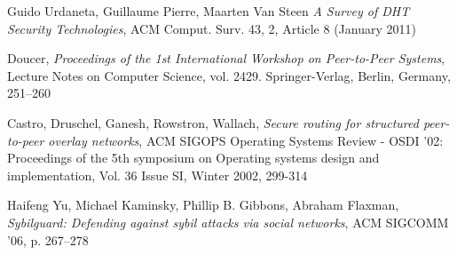 \begin{thebibliography}{99}

 Guido Urdaneta, Guillaume Pierre, Maarten Van Steen
\textit{A Survey of DHT Security Technologies}, ACM Comput. Surv.  43, 2,
Article 8 (January 2011)

 Doucer, \textit{Proceedings of the 1st International
Workshop on Peer-to-Peer Systems}, Lecture Notes on Computer Science, vol. 2429.
Springer-Verlag, Berlin, Germany, 251–260

 Castro, Druschel, Ganesh, Rowstron, Wallach,
\textit{Secure routing for structured peer-to-peer overlay networks},
ACM SIGOPS Operating Systems Review - OSDI '02: Proceedings of the 5th symposium
on Operating systems design and implementation,
Vol. 36 Issue SI, Winter 2002,
299-314

Haifeng Yu, Michael Kaminsky, Phillip B. Gibbons, Abraham Flaxman,
\textit{Sybilguard: Defending against sybil attacks via social networks},
ACM SIGCOMM ’06, p. 267--278


\end{thebibliography}
